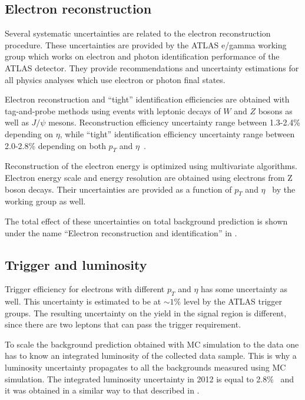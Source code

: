 \subsection{Electron reconstruction}
Several systematic uncertainties are related to the electron reconstruction procedure.
These uncertainties are provided by the ATLAS e/gamma working group which works on electron and photon identification performance of the ATLAS detector.
They provide recommendations and uncertainty estimations for all physics analyses which use electron or photon final states.

Electron reconstruction and ``tight'' identification efficiencies are obtained with tag-and-probe methods using
events with leptonic decays of $W$ and $Z$ bosons as well as $J/\psi$ mesons.
Reconstruction efficiency uncertainty range between 1.3-2.4\% depending on $\eta$, while
``tight'' identification efficiency uncertainty range between 2.0-2.8\% depending on both $p_T$ and $\eta$~\cite{electron_reco_id_2011}.

Reconstruction of the electron energy is optimized using multivariate algorithms.
Electron energy scale and energy resolution are obtained using electrons from Z boson decays.
Their uncertainties are provided as a function of $p_T$ and $\eta$~\cite{electron_energy_errors_Run1} 
by the working group as well.

The total effect of these uncertainties on total background prediction 
is shown under the name ``Electron reconstruction and identification'' in .

\subsection{Trigger and luminosity}
Trigger efficiency for electrons with different $p_T$ and $\eta$ has some uncertainty as well.
This uncertainty is estimated to be at $\sim1\%$ level by the ATLAS trigger groups.
The resulting uncertainty on the yield in the signal region is different, since there are two leptons that can pass the trigger requirement. 

To scale the background prediction obtained with MC simulation to the data 
one has to know an integrated luminosity of the collected data sample. 
This is why a luminosity uncertainty propagates to all the backgrounds measured using MC simulation.
The integrated luminosity uncertainty in 2012 is equal to 2.8$\%$~\cite{Aad:2013ucp} 
and it was obtained in a similar way to that described in .

